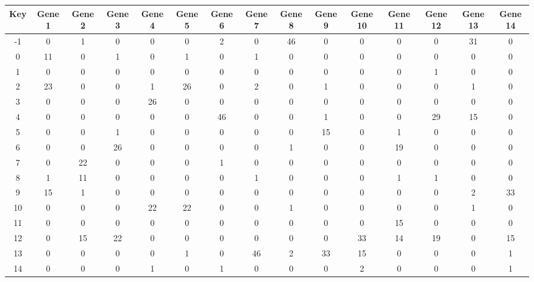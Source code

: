 \begin{tabular}{|c|c|c|c|c|c|c|c|c|c|c|c|c|c|c|}
\hline
Key & Gene 1 & Gene 2 & Gene 3 & Gene 4 & Gene 5 & Gene 6 & Gene 7 & Gene 8 & Gene 9 & Gene 10 & Gene 11 & Gene 12 & Gene 13 & Gene 14 \\
\hline
-1 & 0 & 1 & 0 & 0 & 0 & 2 & 0 & 46 & 0 & 0 & 0 & 0 & 31 & 0 \\
0 & 11 & 0 & 1 & 0 & 1 & 0 & 1 & 0 & 0 & 0 & 0 & 0 & 0 & 0 \\
1 & 0 & 0 & 0 & 0 & 0 & 0 & 0 & 0 & 0 & 0 & 0 & 1 & 0 & 0 \\
2 & 23 & 0 & 0 & 1 & 26 & 0 & 2 & 0 & 1 & 0 & 0 & 0 & 1 & 0 \\
3 & 0 & 0 & 0 & 26 & 0 & 0 & 0 & 0 & 0 & 0 & 0 & 0 & 0 & 0 \\
4 & 0 & 0 & 0 & 0 & 0 & 46 & 0 & 0 & 1 & 0 & 0 & 29 & 15 & 0 \\
5 & 0 & 0 & 1 & 0 & 0 & 0 & 0 & 0 & 15 & 0 & 1 & 0 & 0 & 0 \\
6 & 0 & 0 & 26 & 0 & 0 & 0 & 0 & 1 & 0 & 0 & 19 & 0 & 0 & 0 \\
7 & 0 & 22 & 0 & 0 & 0 & 1 & 0 & 0 & 0 & 0 & 0 & 0 & 0 & 0 \\
8 & 1 & 11 & 0 & 0 & 0 & 0 & 1 & 0 & 0 & 0 & 1 & 1 & 0 & 0 \\
9 & 15 & 1 & 0 & 0 & 0 & 0 & 0 & 0 & 0 & 0 & 0 & 0 & 2 & 33 \\
10 & 0 & 0 & 0 & 22 & 22 & 0 & 0 & 1 & 0 & 0 & 0 & 0 & 1 & 0 \\
11 & 0 & 0 & 0 & 0 & 0 & 0 & 0 & 0 & 0 & 0 & 15 & 0 & 0 & 0 \\
12 & 0 & 15 & 22 & 0 & 0 & 0 & 0 & 0 & 0 & 33 & 14 & 19 & 0 & 15 \\
13 & 0 & 0 & 0 & 0 & 1 & 0 & 46 & 2 & 33 & 15 & 0 & 0 & 0 & 1 \\
14 & 0 & 0 & 0 & 1 & 0 & 1 & 0 & 0 & 0 & 2 & 0 & 0 & 0 & 1 \\
\hline
\end{tabular}